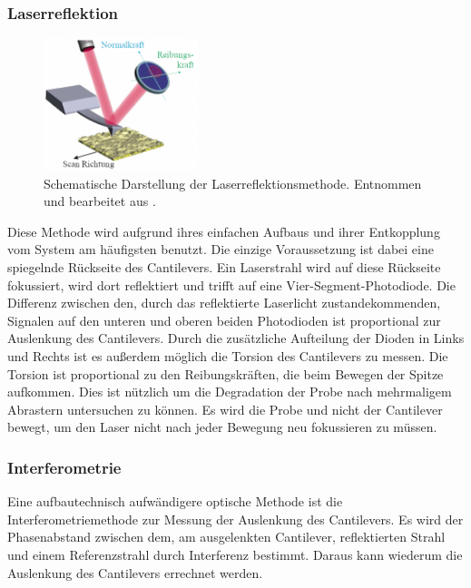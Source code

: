     \subsubsection*{Laserreflektion}
        \begin{figure}
            \vspace{-1cm}
            \centering{}
            \includegraphics[width=0.4\textwidth]{bilder/Viersegmentphotodiode.png}
            \caption{Schematische Darstellung der Laserreflektionsmethode. Entnommen und bearbeitet aus \cite{voigtlaender}.} \vspace*{-0.3cm}
            \label{fig:Viersegmentphotodiode}
        \end{figure}
        \FloatBarrier
        Diese Methode wird aufgrund ihres einfachen Aufbaus und ihrer Entkopplung vom System am häufigsten benutzt.
        Die einzige Voraussetzung ist dabei eine spiegelnde Rückseite des Cantilevers.
        Ein Laserstrahl wird auf diese Rückseite fokussiert, wird dort reflektiert und trifft auf eine Vier-Segment-Photodiode.
        Die Differenz zwischen den, durch das reflektierte Laserlicht zustandekommenden, Signalen auf den unteren und oberen beiden Photodioden ist proportional zur Auslenkung des Cantilevers.
        Durch die zusätzliche Aufteilung der Dioden in Links und Rechts ist es außerdem möglich die Torsion des Cantilevers zu messen.
        Die Torsion ist proportional zu den Reibungskräften, die beim Bewegen der Spitze aufkommen.
        Dies ist nützlich um die Degradation der Probe nach mehrmaligem Abrastern untersuchen zu können.
        Es wird die Probe und nicht der Cantilever bewegt, um den Laser nicht nach jeder Bewegung neu fokussieren zu müssen.

    \subsubsection*{Interferometrie}
        Eine aufbautechnisch aufwändigere optische Methode ist die Interferometriemethode zur Messung der Auslenkung des Cantilevers.
        Es wird der Phasenabstand zwischen dem, am ausgelenkten Cantilever, reflektierten Strahl und einem Referenzstrahl durch Interferenz bestimmt.
        Daraus kann wiederum die Auslenkung des Cantilevers errechnet werden.

